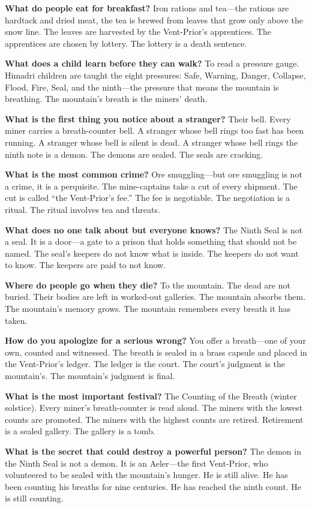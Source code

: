 \vspace{1em}

\begin{almanac}
\textbf{What do people eat for breakfast?} Iron rations and tea---the rations are hardtack and dried meat, the tea is brewed from leaves that grow only above the snow line. The leaves are harvested by the Vent-Prior's apprentices. The apprentices are chosen by lottery. The lottery is a death sentence.

\textbf{What does a child learn before they can walk?} To read a pressure gauge. Himadri children are taught the eight pressures: Safe, Warning, Danger, Collapse, Flood, Fire, Seal, and the ninth---the pressure that means the mountain is breathing. The mountain's breath is the miners' death.

\textbf{What is the first thing you notice about a stranger?} Their bell. Every miner carries a breath-counter bell. A stranger whose bell rings too fast has been running. A stranger whose bell is silent is dead. A stranger whose bell rings the ninth note is a demon. The demons are sealed. The seals are cracking.

\textbf{What is the most common crime?} Ore smuggling---but ore smuggling is not a crime, it is a perquisite. The mine-captains take a cut of every shipment. The cut is called ``the Vent-Prior's fee.'' The fee is negotiable. The negotiation is a ritual. The ritual involves tea and threats.

\textbf{What does no one talk about but everyone knows?} The Ninth Seal is not a seal. It is a door---a gate to a prison that holds something that should not be named. The seal's keepers do not know what is inside. The keepers do not want to know. The keepers are paid to not know.

\textbf{Where do people go when they die?} To the mountain. The dead are not buried. Their bodies are left in worked-out galleries. The mountain absorbs them. The mountain's memory grows. The mountain remembers every breath it has taken.

\textbf{How do you apologize for a serious wrong?} You offer a breath---one of your own, counted and witnessed. The breath is sealed in a brass capsule and placed in the Vent-Prior's ledger. The ledger is the court. The court's judgment is the mountain's. The mountain's judgment is final.

\textbf{What is the most important festival?} The Counting of the Breath (winter solstice). Every miner's breath-counter is read aloud. The miners with the lowest counts are promoted. The miners with the highest counts are retired. Retirement is a sealed gallery. The gallery is a tomb.

\textbf{What is the secret that could destroy a powerful person?} The demon in the Ninth Seal is not a demon. It is an Aeler---the first Vent-Prior, who volunteered to be sealed with the mountain's hunger. He is still alive. He has been counting his breaths for nine centuries. He has reached the ninth count. He is still counting.
\end{almanac}

\newpage

\newpage